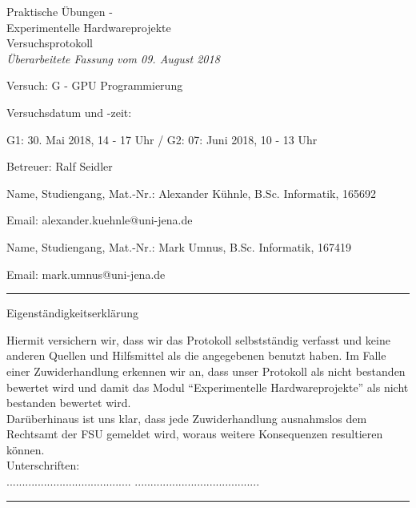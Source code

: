 \documentclass[12pt,a4paper]{scrartcl}
\begin{document}
\thispagestyle{empty}

\begin{center}
  \LARGE
  Praktische \"Ubungen - \\
  Experimentelle Hardwareprojekte \\
  \bigskip
  \Large 
  Versuchsprotokoll\\
  \small{\emph{\"Uberarbeitete Fassung vom 09. August 2018}}
\end{center}

\vspace{1em}
Versuch: G - GPU Programmierung

Versuchsdatum und -zeit:

G1: 30. Mai 2018, 14 - 17 Uhr / G2: 07: Juni 2018, 10 - 13 Uhr 

Betreuer: Ralf Seidler

\vspace{1em}
Name, Studiengang, Mat.-Nr.: Alexander K\"uhnle, B.Sc. Informatik, 165692

Email: alexander.kuehnle@uni-jena.de

\vspace{1em}
Name, Studiengang, Mat.-Nr.: Mark Umnus, B.Sc. Informatik, 167419

Email: mark.umnus@uni-jena.de

\vspace*{1cm}
\hrule
\vspace*{1cm}
{\Large  Eigenst\"andigkeitserkl\"arung }
 
Hiermit versichern wir, dass wir das Protokoll selbstst\"andig verfasst
und keine anderen Quellen und Hilfsmittel als die angegebenen benutzt 
haben. Im Falle einer Zuwiderhandlung erkennen wir an, dass unser Protokoll 
als nicht bestanden bewertet wird und damit das Modul ``Experimentelle 
Hardwareprojekte'' als nicht bestanden bewertet wird. \\
Dar\"uberhinaus ist uns klar, dass jede Zuwiderhandlung ausnahmslos dem 
Rechtsamt der FSU gemeldet wird, woraus weitere Konsequenzen resultieren 
k\"onnen. \\

Unterschriften: \\ 
\hspace*{4cm} ........................................ 
\hspace{2cm} ........................................  \\

\hrule
\end{document}
